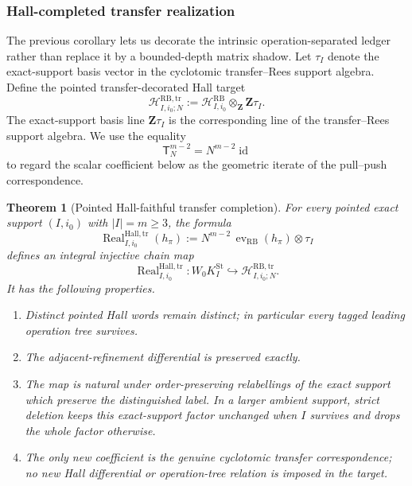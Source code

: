 \documentclass[11pt]{article}
\newtheorem{theorem}{Theorem}[section]
\theoremstyle{remark}
\newcommand{\Z}{\mathbf Z}
\newcommand{\Real}{\operatorname{Real}}
\begin{document}
\subsubsection{Hall-completed transfer realization}

The previous corollary lets us decorate the intrinsic operation-separated
ledger rather than replace it by a bounded-depth matrix shadow.  Let
$\tau_I$ denote the exact-support basis vector in the cyclotomic transfer--Rees
support algebra.  Define the pointed transfer-decorated Hall target
\begin{equation}
 \boxed{
 \mathscr H_{I,i_0;N}^{\mathrm{RB,tr}}
 :=\mathscr H_{I,i_0}^{\mathrm{RB}}\otimes_{\Z}\Z\tau_I.}
\end{equation}
The exact-support basis line $\Z\tau_I$ is the corresponding line of the transfer--Rees support algebra.  We use the equality
\[
 \mathsf T_N^{m-2}=N^{m-2}\operatorname{id}
\]
to regard the scalar coefficient below as the geometric iterate of the pull--push correspondence.

\begin{theorem}[Pointed Hall-faithful transfer completion]
\label{P2M-thm:v14-hall-faithful-transfer}
For every pointed exact support $(I,i_0)$ with $|I|=m\ge3$, the formula
\begin{equation}
 \boxed{
 \Real_{I,i_0}^{\mathrm{Hall,tr}}(h_\pi)
 :=N^{m-2}\,
   \operatorname{ev}_{\mathrm{RB}}(h_\pi)\otimes\tau_I}
\end{equation}
defines an integral injective chain map
\[
 \Real_{I,i_0}^{\mathrm{Hall,tr}}:
 W_0K_I^{\mathrm{St}}
 \hookrightarrow
 \mathscr H_{I,i_0;N}^{\mathrm{RB,tr}}.
\]
It has the following properties.
\begin{enumerate}[label=\textup{(\roman*)}]
\item Distinct pointed Hall words remain distinct; in particular every tagged
      leading operation tree survives.
\item The adjacent-refinement differential is preserved exactly.
\item The map is natural under order-preserving relabellings of the exact support which preserve the distinguished label.  In a larger ambient support, strict deletion keeps this exact-support factor unchanged when $I$ survives and drops the whole factor otherwise.
\item The only new coefficient is the genuine cyclotomic transfer
      correspondence; no new Hall differential or operation-tree relation is
      imposed in the target.
\end{enumerate}
\end{theorem}
\end{document}
